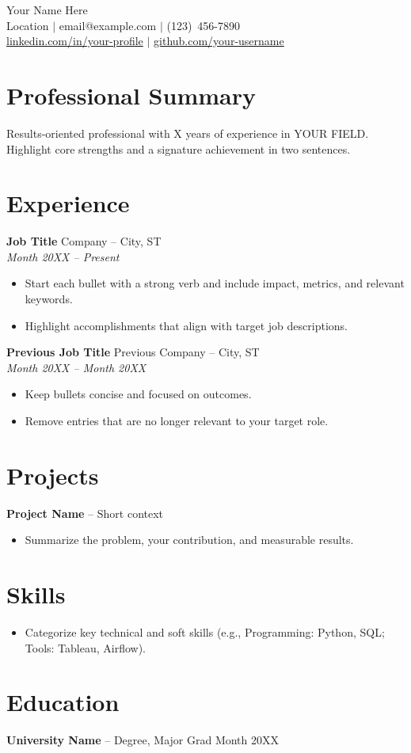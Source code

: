 \documentclass[11pt]{article}
\begin{document}
\begin{center}
    {\LARGE Your Name Here}\\
    \vspace{4pt}
    Location \enspace $\vert$ \enspace email@example.com \enspace $\vert$ \enspace (123)~456-7890\\
    \href{https://linkedin.com/in/your-profile}{linkedin.com/in/your-profile} $\vert$ 
    \href{https://github.com/your-username}{github.com/your-username}
\end{center}

\section*{Professional Summary}
Results-oriented professional with X years of experience in YOUR FIELD. Highlight core strengths and
a signature achievement in two sentences.

\section*{Experience}
\textbf{Job Title} \hfill Company -- City, ST\\
\textit{Month 20XX -- Present}
\begin{itemize}[leftmargin=*]
    \item Start each bullet with a strong verb and include impact, metrics, and relevant keywords.
    \item Highlight accomplishments that align with target job descriptions.
\end{itemize}

\textbf{Previous Job Title} \hfill Previous Company -- City, ST\\
\textit{Month 20XX -- Month 20XX}
\begin{itemize}[leftmargin=*]
    \item Keep bullets concise and focused on outcomes.
    \item Remove entries that are no longer relevant to your target role.
\end{itemize}

\section*{Projects}
\textbf{Project Name} -- Short context
\begin{itemize}[leftmargin=*]
    \item Summarize the problem, your contribution, and measurable results.
\end{itemize}

\section*{Skills}
\begin{itemize}[leftmargin=*]
    \item Categorize key technical and soft skills (e.g., Programming: Python, SQL; Tools: Tableau, Airflow).
\end{itemize}

\section*{Education}
\textbf{University Name} -- Degree, Major \hfill Grad Month 20XX
\end{document}
